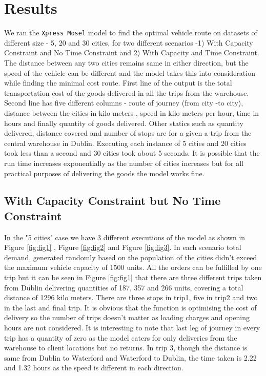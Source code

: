 \documentclass[a4paper,11pt]{article}
\begin{document}
\section{Results}

We ran the \texttt{Xpress Mosel} model  to find the optimal vehicle route on datasets of different size - 5,  20 and 30 cities, for two different scenarios -1) With Capacity Constraint and No Time Constraint and 2) With Capacity and Time Constraint. The distance between any two cities remains same in either direction, but the speed of the vehicle can be different and the model takes this into consideration while finding the minimal cost route. First line of the output is the total transportation cost of the goods delivered in all the trips from the warehouse. Second line has five different columns - route of journey (from city -to city), distance between the cities in kilo meters , speed in kilo meters per hour, time in hours and finally quantity of goods delivered. Other statics such as quantity 
delivered, distance covered and number of stops are for a given a trip from the central warehouse in Dublin. Executing each instance of 5 cities and 20 cities took less than a second and 30 cities took about 5 seconds. It is possible that the run time increases exponentially as the number of cities increases but for all practical purposes of delivering the goods the model works fine.



\subsection{With Capacity Constraint but No Time Constraint}

In the "5 cities" case we have 3 different executions of the model as shown in Figure \ref{fig:fig1} , Figure \ref{fig:fig2}  and Figure \ref{fig:fig3}. In each scenario total demand, generated randomly based on the population of the cities didn't exceed the maximum vehicle capacity of 1500 units.  All the orders can be fulfilled by one trip but it can be seen in Figure \ref{fig:fig1} that there are three different trips taken from Dublin delivering quantities of 187, 357 and 266 units, covering a total distance of 1296 kilo meters. There are three stops in trip1, five in trip2 and two in the last and final trip. It is obvious that the function is optimising the cost of delivery so the number of trips doesn't matter as loading charges and opening hours are not considered. It is interesting to note that last leg of journey in every trip has a quantity of zero as the model caters for only deliveries from the warehouse to client locations but no returns. In trip 3, though the distance is same from Dublin to Waterford and Waterford to Dublin, the time taken is 2.22 and 1.32 hours as the speed is different in each direction.\\
\end{document}
